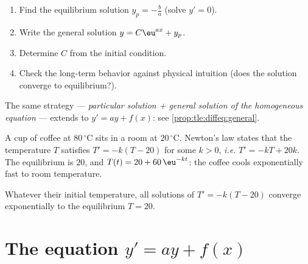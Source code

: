 \begin{method}[Solving $y' = ay + b$ with an initial condition]\label{met:tle:diffeq:solve}
\begin{enumerate}
  \item Find the equilibrium solution $y_p = -\frac{b}{a}$ (solve $y' = 0$).
  \item Write the general solution $y = C\eu^{ax} + y_p$.
  \item Determine $C$ from the initial condition.
  \item Check the long-term behavior against physical intuition (does the
        solution converge to equilibrium?).
\end{enumerate}
The same strategy --- \emph{particular solution + general solution of the
homogeneous equation} --- extends to $y' = ay + f(x)$: see
\cref{prop:tle:diffeq:general}.
\end{method}

\begin{example}\label{ex:tle:diffeq:cooling}
A cup of coffee at $80\,^\circ$C sits in a room at $20\,^\circ$C. Newton's law states
that the temperature $T$ satisfies $T' = -k(T - 20)$ for some $k > 0$,
\emph{i.e.} $T' = -kT + 20k$. The equilibrium is $20$, and
$T(t) = 20 + 60\,\eu^{-kt}$: the coffee cools exponentially fast to room
temperature.
\end{example}

\begin{omfigure}

{\small Whatever their initial temperature, all solutions of
$T' = -k(T - 20)$ converge exponentially to the equilibrium $T = 20$.}
\end{omfigure}

\section{The equation \texorpdfstring{$y' = ay + f(x)$}{y' = ay + f(x)}}

